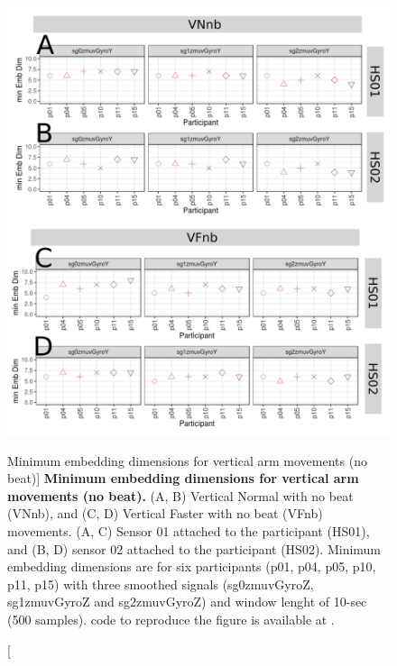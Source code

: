 \begin{figure}
\centering
\includegraphics[width=1.0\textwidth]{cao_Vnb_w10}
	\caption
	[Minimum embedding dimensions for vertical arm movements 
	(no beat)]{
	{\bf Minimum embedding dimensions for vertical arm movements 
	(no beat).} 
		(A, B) Vertical Normal with no beat (VNnb), and 
		(C, D) Vertical Faster with no beat (VFnb) movements.
		(A, C) Sensor 01 attached to the participant (HS01), and
		(B, D) sensor 02 attached to the participant (HS02).
		Minimum embedding dimensions are for six participants 
		(p01, p04, p05, p10, p11, p15) with three smoothed signals 
		(sg0zmuvGyroZ, sg1zmuvGyroZ and sg2zmuvGyroZ)
		and window lenght of 10-sec (500 samples).
		\R code to reproduce the figure is available at 
		.
        }
    \label{fig:a:caoVnb}
\end{figure}
